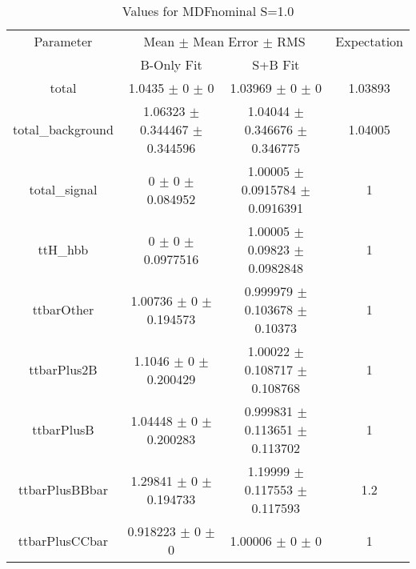\begin{table}
\centering
\caption{Values for MDFnominal S=1.0}
\begin{tabular}{cccc}
\toprule
Parameter & \multicolumn{2}{c}{Mean $\pm$ Mean Error $\pm$ RMS} & Expectation\\
 & B-Only Fit & S+B Fit & \\
\midrule
total & \num{1.0435} $\pm$ \num{0} $\pm$ \num{0} & \num{1.03969} $\pm$ \num{0} $\pm$ \num{0} & \num{1.03893}\\
total\_background & \num{1.06323} $\pm$ \num{0.344467} $\pm$ \num{0.344596} & \num{1.04044} $\pm$ \num{0.346676} $\pm$ \num{0.346775} & \num{1.04005}\\
total\_signal & \num{0} $\pm$ \num{0} $\pm$ \num{0.084952} & \num{1.00005} $\pm$ \num{0.0915784} $\pm$ \num{0.0916391} & \num{1}\\
ttH\_hbb & \num{0} $\pm$ \num{0} $\pm$ \num{0.0977516} & \num{1.00005} $\pm$ \num{0.09823} $\pm$ \num{0.0982848} & \num{1}\\
ttbarOther & \num{1.00736} $\pm$ \num{0} $\pm$ \num{0.194573} & \num{0.999979} $\pm$ \num{0.103678} $\pm$ \num{0.10373} & \num{1}\\
ttbarPlus2B & \num{1.1046} $\pm$ \num{0} $\pm$ \num{0.200429} & \num{1.00022} $\pm$ \num{0.108717} $\pm$ \num{0.108768} & \num{1}\\
ttbarPlusB & \num{1.04448} $\pm$ \num{0} $\pm$ \num{0.200283} & \num{0.999831} $\pm$ \num{0.113651} $\pm$ \num{0.113702} & \num{1}\\
ttbarPlusBBbar & \num{1.29841} $\pm$ \num{0} $\pm$ \num{0.194733} & \num{1.19999} $\pm$ \num{0.117553} $\pm$ \num{0.117593} & \num{1.2}\\
ttbarPlusCCbar & \num{0.918223} $\pm$ \num{0} $\pm$ \num{0} & \num{1.00006} $\pm$ \num{0} $\pm$ \num{0} & \num{1}\\
\bottomrule
\end{tabular}
\end{table}
